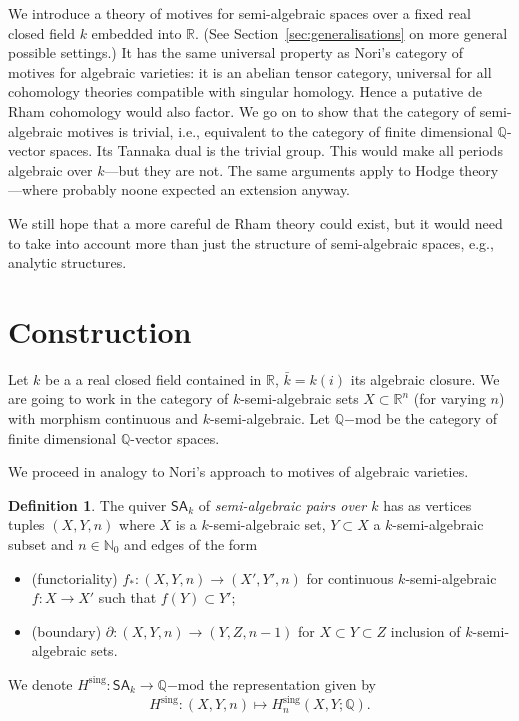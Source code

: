 \documentclass[11pt,a4paper]{amsart}
\theoremstyle{definition}
\newtheorem{defn}[lemma]{Definition}
\newcommand{\Qmod}{\Q\mathrm{-mod}}
\newcommand{\sing}{\mathrm{sing}}
\newcommand{\Hsing}{H^\sing}
\newcommand{\SA}{\mathsf{SA}}
\newcommand{\Q}{\mathbb{Q}}
\newcommand{\R}{\mathbb{R}}
\newcommand{\Na}{\mathbb{N}}
\begin{document}
We introduce a theory of motives for semi-algebraic spaces over a fixed real closed field $k$ embedded into $\R$. (See Section~\ref{sec:generalisations} on more general possible settings.) It has the same universal property as Nori's category of motives for algebraic varieties: it is an abelian tensor category, universal for all cohomology theories compatible with singular homology. Hence a putative de Rham cohomology would also factor. We go on to show that the category of semi-algebraic motives is trivial, i.e., equivalent to the category of finite dimensional $\Q$-vector spaces. Its Tannaka dual is the trivial group. This would make all periods algebraic over $k$---but they are not. The same arguments apply to Hodge theory---where probably noone expected an extension anyway.

We still hope that a more careful de Rham theory could exist, but it would need to take into account more than just the structure of semi-algebraic spaces, e.g., analytic structures.



\section{Construction}
Let $k$ be a a real closed field contained in $\R$, $\bar{k}=k(i)$ its algebraic closure.
We are going to work in the category of $k$-semi-algebraic sets $X\subset\R^n$ (for varying $n$)
with morphism continuous and $k$-semi-algebraic. 
Let $\Qmod$ be the category of finite dimensional $\Q$-vector spaces.

We proceed in analogy to Nori's approach to motives of algebraic varieties.

\begin{defn}The quiver $\SA_k$ of \emph{semi-algebraic pairs over $k$}
has as vertices tuples $(X,Y,n)$ where $X$ is a $k$-semi-algebraic set,
$Y\subset X$ a $k$-semi-algebraic subset and $n\in\Na_0$ and edges of the form
\begin{itemize}
\item (functoriality) $f_*:(X,Y,n)\to (X',Y',n)$ for continuous
$k$-semi-algebraic $f:X\to X'$ such that $f(Y)\subset Y'$;
\item (boundary) $\partial: (X,Y,n)\to (Y,Z,n-1)$ for
$X\subset Y\subset Z$ inclusion of $k$-semi-algebraic sets.
\end{itemize}
We denote $\Hsing:\SA_k\to\Qmod$ the representation given by
\[ \Hsing: (X,Y,n)\mapsto H_n^\sing(X,Y;\Q).\]
\end{defn}
\end{document}
